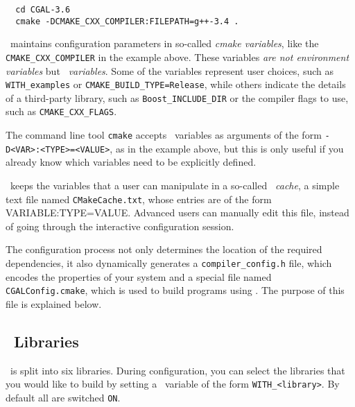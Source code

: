 {\ccTexHtml{\scriptsize}{}
\begin{verbatim}
  cd CGAL-3.6
  cmake -DCMAKE_CXX_COMPILER:FILEPATH=g++-3.4 . 
\end{verbatim}
}


\cmake\ maintains configuration parameters in so-called {\em cmake variables}, like the \texttt{CMAKE\_CXX\_COMPILER}
in the example above. These variables {\em are not environment variables} but {\em \cmake\ variables}. Some of the \cmake{} 
variables represent user choices, such as \texttt{WITH\_examples} or \texttt{CMAKE\_BUILD\_TYPE=Release}, while others
indicate the details of a third-party library, such as \texttt{Boost\_INCLUDE\_DIR} or the compiler flags to use,
such as \texttt{CMAKE\_CXX\_FLAGS}. 

The command line tool \texttt{cmake} accepts \cmake\ variables as arguments of the form \texttt{-D<VAR>:<TYPE>=<VALUE>}, as
in the example above, but this is only useful if you already know which variables need to be explicitly defined.

\begin{ccAdvanced}
\cmake\ keeps the variables that a user can manipulate in a so-called {\em \cmake\ cache}, a simple text file 
named \texttt{CMakeCache.txt}, whose entries are of the form VARIABLE:TYPE=VALUE. Advanced users can manually edit this 
file, instead of going through the interactive configuration session.
\end{ccAdvanced}


The configuration process not only determines the location of the required dependencies, it also dynamically generates a
\texttt{compiler\_config.h} file, which encodes the properties of your system and a special file named 
\texttt{CGALConfig.cmake}, which is used to build programs using \cgal. The
purpose of this file is explained below.

\subsection{\cgal\ Libraries}

\cgal\ is split into six libraries. During configuration, you can select the libraries that 
you would like to build by setting a \cmake\ variable of the form {\tt WITH\_<library>}. By default all 
are switched \texttt{ON}.

